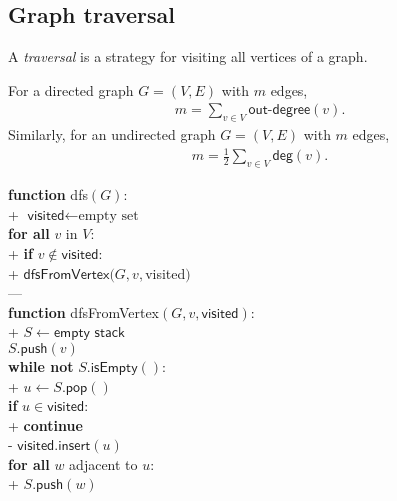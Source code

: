 \documentclass{article}
\begin{document}
\subsection{Graph traversal}

\begin{definition}
	A \emph{traversal} is a strategy for visiting all vertices of a graph.
\end{definition}

\begin{lemma}
	For a directed graph $G=(V,E)$ with $m$ edges,
	\begin{align*}
		m=\sum_{v\in V} \textsf{out-degree}(v).
	\end{align*}
	Similarly, for an undirected graph $G=(V,E)$ with $m$ edges,
	\begin{align*}
		m=\frac{1}{2}\sum_{v\in V}\textsf{deg}(v).
	\end{align*}
\end{lemma}

\begin{pseudo}
	\textbf{function} \textsf{dfs}$(G)$:											\\+
	$\textsf{visited}\leftarrow\text{empty set}$								\\
	\textbf{for all} $v$ in $V$:												\\+
	\textbf{if} $v\not\in\textsf{visited}$:									\\+
	$\textsf{dfsFromVertex}(G, v, $\textsf{visited}$)$						\\---
	\\
	\textbf{function} \textsf{dfsFromVertex}$(G,v,\textsf{visited})$: 				\\+
	$S\leftarrow \textsf{empty stack}$											\\
	$S.\textsf{push}(v)$														\\
	\textbf{while not} $S.\textsf{isEmpty}()$:									\\+
	$u\leftarrow S.\textsf{pop}()$											\\
	\textbf{if} $u\in \textsf{visited}$:									\\+
	\textbf{continue}													\\-
	$\textsf{visited}.\textsf{insert}(u)$									\\
	\textbf{for all} $w$ adjacent to $u$:									\\+
	$S.\textsf{push}(w)$
\end{pseudo}
\end{document}
